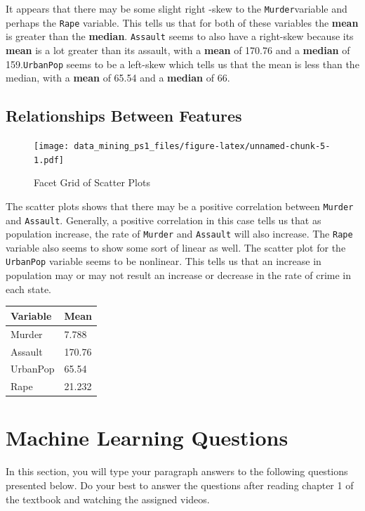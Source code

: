 \documentclass[
  12pt,
]{article}
\begin{document}
It appears that there may be some slight right -skew to the
\texttt{Murder}variable and perhaps the \texttt{Rape} variable. This
tells us that for both of these variables the \textbf{mean} is greater
than the \textbf{median}. \texttt{Assault} seems to also have a
right-skew because its \textbf{mean} is a lot greater than its assault,
with a \textbf{mean} of 170.76 and a \textbf{median} of
159.\texttt{UrbanPop} seems to be a left-skew which tells us that the
mean is less than the median, with a \textbf{mean} of 65.54 and a
\textbf{median} of 66.

\hypertarget{relationships-between-features}{%
\subsection{Relationships Between
Features}\label{relationships-between-features}}

\begin{figure}
\centering
\texttt{[image: data\_mining\_ps1\_files/figure-latex/unnamed-chunk-5-1.pdf]}
\caption{Facet Grid of Scatter Plots}
\end{figure}

The scatter plots shows that there may be a positive correlation between
\texttt{Murder} and \texttt{Assault}. Generally, a positive correlation
in this case tells us that as population increase, the rate of
\texttt{Murder} and \texttt{Assault} will also increase. The
\texttt{Rape} variable also seems to show some sort of linear as well.
The scatter plot for the \texttt{UrbanPop} variable seems to be
nonlinear. This tells us that an increase in population may or may not
result an increase or decrease in the rate of crime in each state.

\begin{longtable}[]{@{}ll@{}}
\toprule
\textbf{Variable} & \textbf{Mean}\tabularnewline
\midrule
\endhead
Murder & 7.788\tabularnewline
Assault & 170.76\tabularnewline
UrbanPop & 65.54\tabularnewline
Rape & 21.232\tabularnewline
\bottomrule
\end{longtable}

\hypertarget{machine-learning-questions}{%
\section{Machine Learning Questions}\label{machine-learning-questions}}

In this section, you will type your paragraph answers to the following
questions presented below. Do your best to answer the questions after
reading chapter 1 of the textbook and watching the assigned videos.
\end{document}
